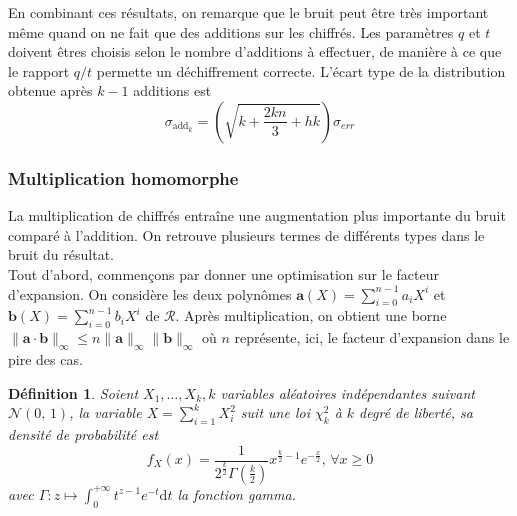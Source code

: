 \documentclass[11pt, headsepline, a4paper, fleqn, oneside]{article}
\newtheorem{defi}{Définition}
\begin{document}
En combinant ces résultats, on remarque que le bruit peut être très important même quand on ne fait que des additions sur les chiffrés. Les paramètres $q$ et $t$ doivent êtres choisis selon le nombre d'additions à effectuer, de manière à ce que le rapport $q/t$ permette un déchiffrement correcte. L'écart type de la distribution obtenue après $k-1$ additions est $$\sigma_{\textrm{add}_k} = \left(\sqrt{k+\frac{2kn}{3}+ hk} \right)\sigma_{err}$$




\subsubsection{Multiplication homomorphe}
La multiplication de chiffrés entraîne une augmentation plus importante du bruit comparé à l'addition. On retrouve plusieurs termes de différents types dans le bruit du résultat.\\
Tout d'abord, commençons par donner une optimisation sur le facteur d'expansion. On considère les deux polynômes $\boldsymbol{a}(X) = \sum_{i=0}^{n-1} a_{i} X^{i}$ et $\boldsymbol{b}(X) = \sum_{i=0}^{n-1} b_{i} X^{i}$ de $\mathcal{R}$. Après multiplication, on obtient une borne $\|\boldsymbol{a}\cdot \boldsymbol{b}\|_{\infty} \leq n\|\boldsymbol{a}\|_{\infty}\|\boldsymbol{b}\|_{\infty}$ où $n$ représente, ici, le facteur d'expansion dans le pire des cas.

\begin{defi}
Soient $X_{1}, \ldots, X_{k}, k$ variables aléatoires indépendantes suivant $\mathcal{N}(0,\, 1)$, la variable $X =\sum_{i=1}^{k} X_{i}^{2}$ suit une loi $\chi ^2 _k$ à $k$ degré de liberté, sa densité de probabilité est $$f_{X}(x)=\frac{1}{2^{\frac{k}{2}} \Gamma\left(\frac{k}{2}\right)} x^{\frac{k}{2}-1} e^{-\frac{x}{2}},\, \forall x\geq0$$
avec $\Gamma : z \mapsto \int_{0}^{+\infty} t^{z-1} e^{-t} \mathrm{d}t$ la fonction gamma.
\end{defi}
\end{document}
